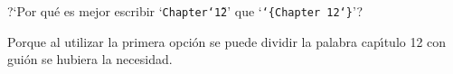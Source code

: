  ?`Por qu\'e es mejor escribir `{\tt Chapter\char`\~12}' 
que `{\tt \string\hbox\char`\{Chapter 12\char`\}}'?

\vskip 6pt

 Porque al utilizar la primera opción se puede dividir la
palabra cap\'{\i}tulo 12 con gui\'on se hubiera la necesidad.
\bye